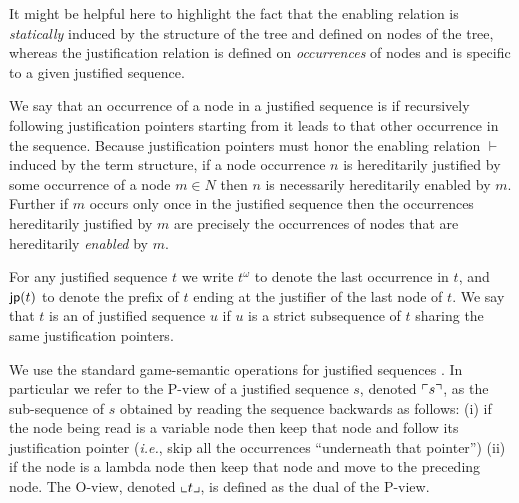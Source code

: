\documentclass{article}
\makeatletter
\theoremstyle{definition}
\newcommand\Nodes{N}%
\newcommand{\enables}{\vdash}
\renewcommand\ie{{\it i.e.\@\xspace}}
\makeatother
\begin{document}
It might be helpful here to highlight the fact that the enabling relation is \emph{statically} induced by the structure of the tree and defined on nodes of the tree, whereas the justification relation is defined on \emph{occurrences} of nodes and is specific to a given justified sequence.

We say that an occurrence of a node in a justified sequence is  if recursively following justification pointers starting from it leads to that other occurrence in the sequence. Because justification pointers must honor the enabling relation $\enables$ induced by the term structure, if a node occurrence $n$ is hereditarily justified by some occurrence of a node $m\in\Nodes$ then $n$ is necessarily hereditarily enabled by $m$. Further if $m$ occurs only once in the justified sequence then the occurrences hereditarily justified by $m$ are precisely the occurrences of nodes that are hereditarily \emph{enabled} by $m$.

For any justified sequence $t$ we write $t^\omega$ to denote the last occurrence in $t$, and ${\sf jp}(t)$ to denote the prefix of $t$ ending at the justifier of the last node of $t$. We say that $t$ is an  of justified sequence $u$ if $u$ is a strict subsequence of $t$ sharing the same justification pointers.

We use the standard game-semantic operations for justified sequences \cite{Abr02}. In particular we refer to the P-view of a justified sequence $s$, denoted $\ulcorner s \urcorner$, as the sub-sequence of $s$ obtained by reading the sequence backwards as follows: (i) if the node being read is a variable node then keep that node and follow its justification pointer (\ie, skip  all the occurrences ``underneath that pointer'') (ii) if the node is a lambda node then keep that node and move to the preceding node. The O-view, denoted $\llcorner t \lrcorner$, is defined as the dual of the P-view.
\end{document}
